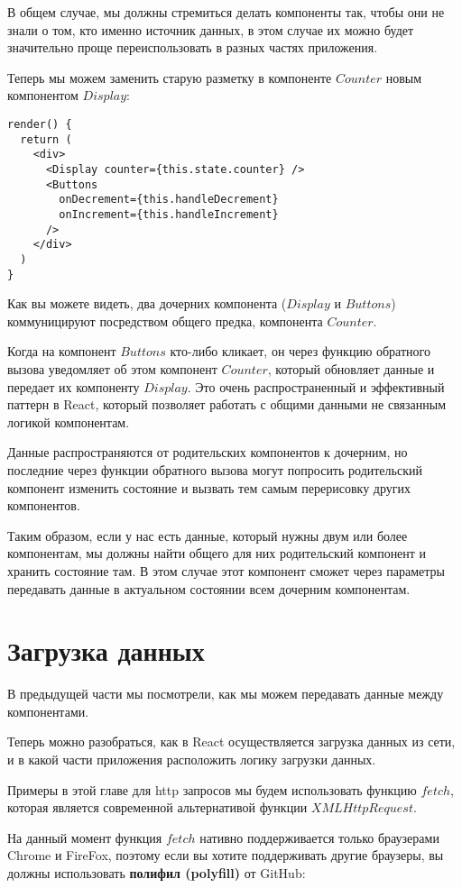 В общем случае, мы должны стремиться делать компоненты так, чтобы они не знали о том, кто именно источник данных, в этом случае их можно будет значительно проще переиспользовать в разных частях приложения.

Теперь мы можем заменить старую разметку в компоненте $Counter$ новым компонентом $Display$:

\begin{lstlisting}
render() {
  return (
    <div>
      <Display counter={this.state.counter} />
      <Buttons
        onDecrement={this.handleDecrement}
        onIncrement={this.handleIncrement}
      />
    </div> 
  )
}
\end{lstlisting}

Как вы можете видеть, два дочерних компонента ($Display$ и $Buttons$) коммуницируют посредством общего предка, компонента $Counter$.

Когда на компонент $Buttons$ кто-либо кликает, он через функцию обратного вызова уведомляет об этом компонент $Counter$, который обновляет данные и передает их компоненту $Display$. Это очень распространенный и эффективный паттерн в React, который позволяет работать с общими данными не связанным логикой компонентам.

Данные распространяются от родительских компонентов к дочерним, но последние через функции обратного вызова могут попросить родительский компонент изменить состояние и вызвать тем самым перерисовку других компонентов.

Таким образом, если у нас есть данные, который нужны двум или более компонентам, мы должны найти общего для них родительский компонент и хранить состояние там. В этом случае этот компонент сможет через параметры передавать данные в актуальном состоянии всем дочерним компонентам.

\section{Загрузка данных}

В предыдущей части мы посмотрели, как мы можем передавать данные между компонентами.

Теперь можно разобраться, как в React осуществляется загрузка данных из сети, и в какой части приложения расположить логику загрузки данных.

Примеры в этой главе для http запросов мы будем использовать функцию $fetch$, которая является современной альтернативой функции $XMLHttpRequest$.

На данный момент функция $fetch$ нативно поддерживается только браузерами Chrome и FireFox, поэтому если вы хотите поддерживать другие браузеры, вы должны использовать \textbf{полифил (polyfill)} от GitHub:

